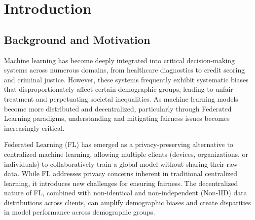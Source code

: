 \documentclass[11pt,a4paper]{report}
\begin{document}
\newpage
   
    \begin{abstract}
This comprehensive project investigates the intersection of Federated Learning and machine learning fairness, specifically focusing on gender classification with attention to demographic disparities across racial groups. Conducted over four months under the direction of Prof. Manisha Padala, this study progresses from foundational Federated Learning concepts through the identification of inherent fairness issues in decentralized learning systems to the development and validation of a novel solution: Dynamic Client-Adaptive Fairness Weighting (DCA-FW). The research demonstrates that standard Federated Learning exhibits significant race-wise accuracy disparities, which are further amplified by adversarial attacks. The proposed DCA-FW method successfully reduces the fairness gap (from 0.0852 to 0.0507 on UTKFace and from 0.0992 to 0.0812 on FairFace) while maintaining stable overall accuracy, proving that client-level adaptive mechanisms are highly effective for addressing demographic bias in decentralized learning environments.
\end{abstract}

\tableofcontents
\newpage

\chapter{Introduction}

\section{Background and Motivation}

Machine learning has become deeply integrated into critical decision-making systems across numerous domains, from healthcare diagnostics to credit scoring and criminal justice. However, these systems frequently exhibit systematic biases that disproportionately affect certain demographic groups, leading to unfair treatment and perpetuating societal inequalities. As machine learning models become more distributed and decentralized, particularly through Federated Learning paradigms, understanding and mitigating fairness issues becomes increasingly critical.

Federated Learning (FL) has emerged as a privacy-preserving alternative to centralized machine learning, allowing multiple clients (devices, organizations, or individuals) to collaboratively train a global model without sharing their raw data. While FL addresses privacy concerns inherent in traditional centralized learning, it introduces new challenges for ensuring fairness. The decentralized nature of FL, combined with non-identical and non-independent (Non-IID) data distributions across clients, can amplify demographic biases and create disparities in model performance across demographic groups.
\end{document}
